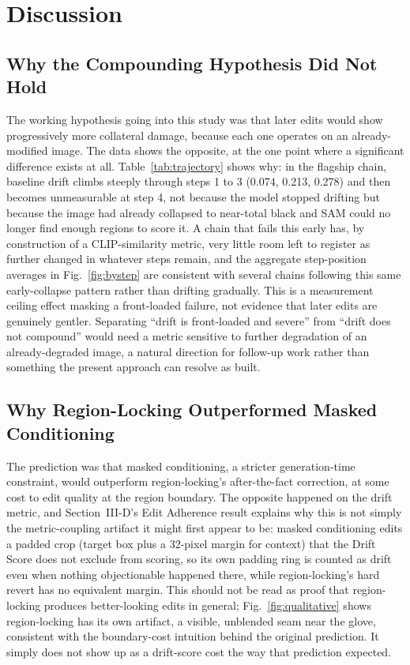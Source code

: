 \vspace{-4pt}
\section{Discussion}

\subsection{Why the Compounding Hypothesis Did Not Hold}
The working hypothesis going into this study was that later edits would show progressively more collateral damage, because each one operates on an already-modified image. The data shows the opposite, at the one point where a significant difference exists at all. Table~\ref{tab:trajectory} shows why: in the flagship chain, baseline drift climbs steeply through steps 1 to 3 (0.074, 0.213, 0.278) and then becomes unmeasurable at step 4, not because the model stopped drifting but because the image had already collapsed to near-total black and SAM could no longer find enough regions to score it. A chain that fails this early has, by construction of a CLIP-similarity metric, very little room left to register as further changed in whatever steps remain, and the aggregate step-position averages in Fig.~\ref{fig:bystep} are consistent with several chains following this same early-collapse pattern rather than drifting gradually. This is a measurement ceiling effect masking a front-loaded failure, not evidence that later edits are genuinely gentler. Separating ``drift is front-loaded and severe'' from ``drift does not compound'' would need a metric sensitive to further degradation of an already-degraded image, a natural direction for follow-up work rather than something the present approach can resolve as built.

\subsection{Why Region-Locking Outperformed Masked Conditioning}
The prediction was that masked conditioning, a stricter generation-time constraint, would outperform region-locking's after-the-fact correction, at some cost to edit quality at the region boundary. The opposite happened on the drift metric, and Section~III-D's Edit Adherence result explains why this is not simply the metric-coupling artifact it might first appear to be: masked conditioning edits a padded crop (target box plus a 32-pixel margin for context) that the Drift Score does not exclude from scoring, so its own padding ring is counted as drift even when nothing objectionable happened there, while region-locking's hard revert has no equivalent margin. This should not be read as proof that region-locking produces better-looking edits in general; Fig.~\ref{fig:qualitative} shows region-locking has its own artifact, a visible, unblended seam near the glove, consistent with the boundary-cost intuition behind the original prediction. It simply does not show up as a drift-score cost the way that prediction expected.

